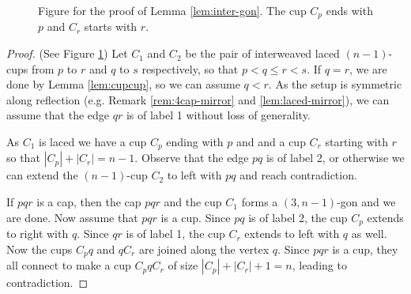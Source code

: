 \documentclass{amsart}
\theoremstyle{definition}
\numberwithin{thm}{section}
\begin{document}
\begin{center}
\begin{figure}
\caption{Figure for the proof of Lemma \ref{lem:inter-gon}. The cup $C_p$ ends with $p$ and $C_r$ starts with $r$.}
\label{fig:lem-inter-gon}
\end{figure}
\end{center}

\begin{proof}
(See Figure \ref{fig:lem-inter-gon}) Let $C_1$ and $C_2$ be the pair of interweaved laced $(n-1)$-cups from $p$ to $r$ and $q$ to $s$ respectively, so that $p < q \leq r < s$.
If $q = r$, we are done by Lemma \ref{lem:cupcup}, so we can assume $q < r$.
As the setup is symmetric along reflection (e.g. Remark \ref{rem:4cap-mirror} and \ref{lem:laced-mirror}), we can assume that the edge $qr$ is of label 1 without loss of generality.

As $C_1$ is laced we have a cup $C_p$ ending with $p$ and
and a cup $C_r$ starting with $r$ so that $|C_p| + |C_r| = n - 1$.
Observe that the edge $pq$ is of label 2, or otherwise we can extend the $(n-1)$-cup $C_2$ to left with $pq$
and reach contradiction.

If $pqr$ is a cap, then the cap $pqr$ and the cup $C_1$ forms a $(3, n-1)$-gon and we are done.
Now assume that $pqr$ is a cup. 
Since $pq$ is of label 2, the cup $C_p$ extends to right with $q$.
Since $qr$ is of label 1, the cup $C_r$ extends to left with $q$ as well.
Now the cups $C_pq$ and $qC_r$ are joined along the vertex $q$.
Since $pqr$ is a cup, they all connect to make a cup $C_pqC_r$ of size $|C_p| + |C_r| + 1 = n$, leading to contradiction.
\end{proof}
\end{document}
